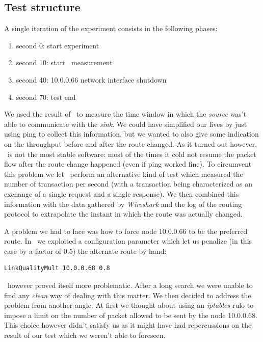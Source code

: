 \subsection{Test structure}
A single iteration of the experiment consists in the following phases:
\begin{enumerate}
\item second 0: start experiment
\item second 10: start \netperf\ measurement
\item second 40: 10.0.0.66 network interface shutdown
\item second 70: test end
\end{enumerate}

We used the result of \netperf\ to measure the time window in
which the \emph{source} was't able to communicate with the
\emph{sink}. We could have simplified our lives by just using ping to
collect this information, but we wanted to also give some indication
on the throughput before and after the route changed. As it turned out
however, \netperf\ is not the most stable software: most of the times
it cold not resume the packet flow after the route change happened (even if
ping worked fine). To circumvent this problem we let \netperf\ perform
an alternative kind of test which measured the number of transaction
per second (with a transaction being characterized as an exchange of a
single request and a single response).
We then combined this information with the data gathered
by \emph{Wireshark} and the log of the routing protocol to extrapolate
the instant in which the route was actually changed.

A problem we had to face was how to force node 10.0.0.66 to be the
preferred route. In \olsr\ we exploited a configuration parameter
which let us penalize (in this case by a factor of 0.5) the alternate
route by hand:

\begin{verbatim}
LinkQualityMult 10.0.0.68 0.8
\end{verbatim}

\batman\ however proved itself more problematic. After a long search
we were unable to find any \emph{clean} way of dealing with this
matter. We then decided to address the problem from another angle.
At first we thought about using an \emph{iptables} rulo to impose a
limit on the number of packet allowed to be sent by the node
10.0.0.68. This choice however didn't satisfy us as it might have had
repercussions on the result of our test which we weren't able to
foreseen.

